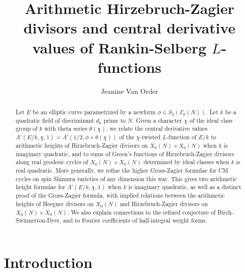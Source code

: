 \documentclass{amsart}
\theoremstyle{definition}
\theoremstyle{definition}
\theoremstyle{definition}
\begin{document}
 

\title{Arithmetic Hirzebruch-Zagier divisors and central derivative values of Rankin-Selberg $L$-functions}

\author{Jeanine Van Order}

\begin{abstract} Let $E$ be an elliptic curve parametrized by a newform $\phi \in S_2(\Gamma_0(N))$. Let $k$ be a quadratic field of discriminant $d_k$ prime to $N$. 
Given a character $\chi$ of the ideal class group of $k$ with theta series $\theta(\chi)$, we relate the central derivative values $\Lambda'(E/k, \chi, 1) = \Lambda'(1/2, \phi \times \theta(\chi))$
of the $\chi$-twisted $L$-function of $E/k$ to arithmetic heights of Hirzebruch-Zagier divisors on $X_0(N)\times X_0(N)$ when $k$ is imaginary quadratic, 
and to sums of Green's functions of Hirzebruch-Zagier divisors along real geodesic cycles of $X_0(N) \times X_0(N)$ determined by ideal classes when $k$ is real quadratic. 
More generally, we refine the higher Gross-Zagier formulae for CM cycles on spin Shimura varieties of any dimension this way. 
This gives two arithmetic height formulae for $\Lambda'(E/k, \chi, 1)$ when $k$ is imaginary quadratic,
as well as a distinct proof of the Gross-Zagier formula, with implied relations between the arithmetic 
heights of Heegner divisors on $X_0(N)$ and Hirzebruch-Zagier divisors on $X_0(N) \times X_0(N)$. 
We also explain connections to the refined conjecture of Birch-Swinnerton-Dyer, and to Fourier coefficients of half-integral weight forms.  \end{abstract}

\maketitle

\section{Introduction}
\end{document}
